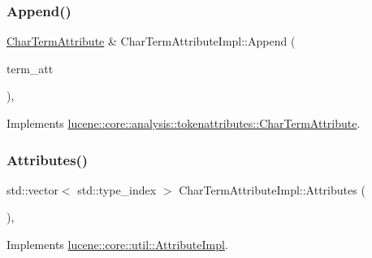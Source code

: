 \subsubsection{\texorpdfstring{Append()}{Append()}\hspace{0.1cm}{\footnotesize\ttfamily [4/4]}}
{\footnotesize\ttfamily \mbox{\hyperlink{classlucene_1_1core_1_1analysis_1_1tokenattributes_1_1CharTermAttribute}{Char\+Term\+Attribute}} \& Char\+Term\+Attribute\+Impl\+::\+Append (\begin{DoxyParamCaption}\item[{\mbox{\hyperlink{ZlibCrc32_8h_a2c212835823e3c54a8ab6d95c652660e}{const}} \mbox{\hyperlink{classlucene_1_1core_1_1analysis_1_1tokenattributes_1_1CharTermAttribute}{Char\+Term\+Attribute}} \&}]{term\+\_\+att }\end{DoxyParamCaption})\hspace{0.3cm}{\ttfamily [override]}, {\ttfamily [virtual]}}



Implements \mbox{\hyperlink{classlucene_1_1core_1_1analysis_1_1tokenattributes_1_1CharTermAttribute_ad8624358a4798446a14fbf35991c43ad}{lucene\+::core\+::analysis\+::tokenattributes\+::\+Char\+Term\+Attribute}}.

\mbox{\label{classlucene_1_1core_1_1analysis_1_1tokenattributes_1_1CharTermAttributeImpl_a7d8986b373cd9c2dfb2de25dd12000fd}} 
\subsubsection{\texorpdfstring{Attributes()}{Attributes()}}
{\footnotesize\ttfamily std\+::vector$<$ std\+::type\+\_\+index $>$ Char\+Term\+Attribute\+Impl\+::\+Attributes (\begin{DoxyParamCaption}{ }\end{DoxyParamCaption})\hspace{0.3cm}{\ttfamily [override]}, {\ttfamily [virtual]}}



Implements \mbox{\hyperlink{classlucene_1_1core_1_1util_1_1AttributeImpl_ac0631e6a7a11044883bc97447716d7cc}{lucene\+::core\+::util\+::\+Attribute\+Impl}}.



